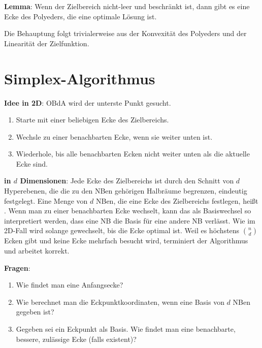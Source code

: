 \linie

\textbf{Lemma}:
Wenn der Zielbereich nicht-leer und beschränkt ist,
dann gibt es eine Ecke des Polyeders, die eine optimale Lösung ist.

\begin{Beweis}
    Die Behauptung folgt trivialerweise aus der Konvexität des Polyeders und der
    Linearität der Zielfunktion.
\end{Beweis}

\section{%
    Simplex-Algorithmus%
}

\textbf{Idee in 2D}:
OBdA wird der unterste Punkt gesucht.
\begin{enumerate}
    \item
    Starte mit einer beliebigen Ecke des Zielbereichs.

    \item
    Wechsle zu einer benachbarten Ecke, wenn sie weiter unten ist.

    \item
    Wiederhole, bis alle benachbarten Ecken nicht weiter unten als die aktuelle Ecke sind.
\end{enumerate}

\linie

\textbf{in $d$ Dimensionen}:
Jede Ecke des Zielbereichs ist durch den Schnitt von $d$ Hyperebenen,
die die zu den NBen gehörigen Halbräume begrenzen, eindeutig festgelegt.
Eine Menge von $d$ NBen, die eine Ecke des Zielbereichs festlegen, heißt .
Wenn man zu einer benachbarten Ecke wechselt, kann das als Basiswechsel so interpretiert werden,
dass eine NB die Basis für eine andere NB verlässt.
Wie im 2D-Fall wird solange gewechselt, bis die Ecke optimal ist.
Weil es höchstens $\binom{n}{d}$ Ecken gibt und keine Ecke mehrfach besucht wird,
terminiert der Algorithmus und arbeitet korrekt.

\linie
\pagebreak

\textbf{Fragen}:
\begin{enumerate}
    \item
    Wie findet man eine Anfangsecke?

    \item
    Wie berechnet man die Eckpunktkoordinaten, wenn eine Basis von $d$ NBen gegeben ist?

    \item
    Gegeben sei ein Eckpunkt als Basis.
    Wie findet man eine benachbarte, bessere, zulässige Ecke (falls existent)?
\end{enumerate}

